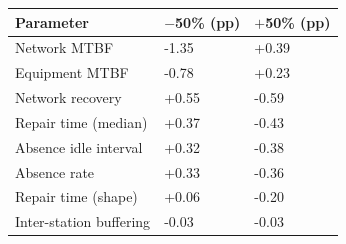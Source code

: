 \begin{tabular}{p{3.0cm}p{1.6cm}p{1.6cm}}
\toprule
\textbf{Parameter} & \textbf{$-$50\% (pp)} & \textbf{$+$50\% (pp)} \\
\midrule
Network MTBF & -1.35 & +0.39 \\
Equipment MTBF & -0.78 & +0.23 \\
Network recovery & +0.55 & -0.59 \\
Repair time (median) & +0.37 & -0.43 \\
Absence idle interval & +0.32 & -0.38 \\
Absence rate & +0.33 & -0.36 \\
Repair time (shape) & +0.06 & -0.20 \\
Inter-station buffering & -0.03 & -0.03 \\
\bottomrule
\end{tabular}